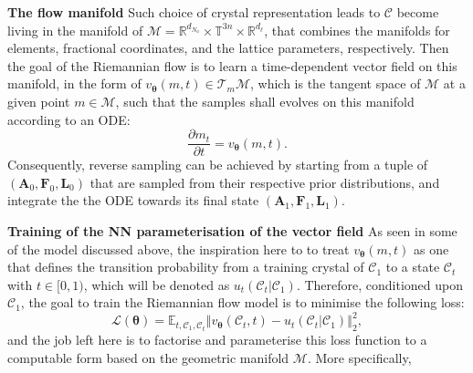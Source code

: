 \begin{myquote}
\hspace{10pt} \textbf{The flow manifold} Such choice of crystal representation leads to $\mathcal{C}$ become living in the manifold of $\mathcal{M}=\mathbb{R}^{d_{N_a}}\times\mathbb{T}^{3n}\times\mathbb{R}^{d_\ell}$, that combines the manifolds for elements, fractional coordinates, and the lattice parameters, respectively. Then the goal of the Riemannian flow is to learn a time-dependent vector field on this manifold, in the form of $v_{\boldsymbol{\theta}}(m,t)\in \mathcal{T}_m\mathcal{M}$, which is the tangent space of $\mathcal{M}$ at a given point $m\in\mathcal{M}$, such that the samples shall evolves on this manifold according to an ODE:
\begin{equation}
    \label{eq:riemannian_flow_ODE}
    \frac{\partial m_t}{\partial t}=v_{\boldsymbol{\theta}}(m,t).
\end{equation}
Consequently, reverse sampling can be achieved by starting from a tuple of $(\bm{A}_0,\bm{F}_0,\bm{L}_0)$ that are sampled from their respective prior distributions, and integrate the the ODE towards its final state  $(\bm{A}_1,\bm{F}_1,\bm{L}_1)$.

\hspace{10pt} \textbf{Training of the NN parameterisation of the vector field} As seen in some of the model discussed above, the inspiration here to to treat $v_{\boldsymbol{\theta}}(m,t)$ as one that defines the transition probability from a training crystal of $\mathcal{C}_{1}$ to a state $\mathcal{C}_t$ with $t\in [0,1)$, which will be denoted as $u_t(\mathcal{C}_t|\mathcal{C}_1)$. Therefore, conditioned upon $\mathcal{C}_1$, the goal to train the Riemannian flow model is to minimise the following loss:
\begin{equation}
\label{eq:riemannian_flow_lost}
\mathcal{L}(\boldsymbol{\theta})=\mathbb{E}_{t,\mathcal{C}_1,\mathcal{C}_t}\left\Vert v_{\boldsymbol{\theta}}(\mathcal{C}_t,t) - u_t(\mathcal{C}_t|\mathcal{C}_1)\right\Vert_2^2,
\end{equation}
and the job left here is to factorise and parameterise this loss function to a computable form based on the geometric manifold $\mathcal{M}$. More specifically,


\end{myquote}
